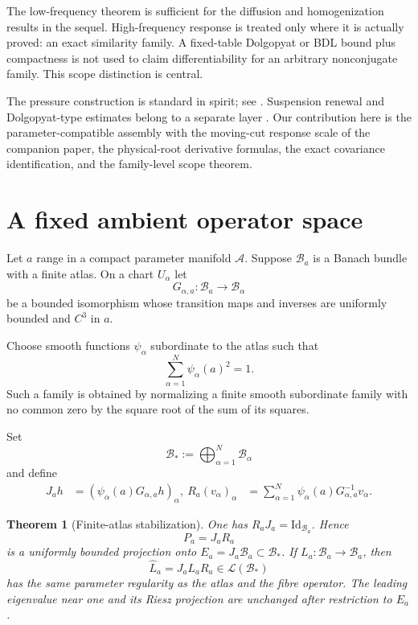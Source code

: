 \documentclass[11pt,reqno]{amsart}
\newtheorem{theorem}{Theorem}[section]
\theoremstyle{definition}
\theoremstyle{remark}
\newcommand{\A}{\mathcal A}
\newcommand{\B}{\mathcal B}
\newcommand{\Id}{\mathrm{Id}}
\begin{document}
The low-frequency theorem is sufficient for the diffusion and homogenization
results in the sequel.  High-frequency response is treated only where it is
actually proved: an exact similarity family.  A fixed-table Dolgopyat or BDL
bound plus compactness is not used to claim differentiability for an arbitrary
nonconjugate family.  This scope distinction is central.

The pressure construction is standard in spirit; see
\cite{Kato1995,KellerLiverani1999,ParryPollicott1990}.  Suspension renewal and
Dolgopyat-type estimates belong to a separate layer
\cite{Dolgopyat1998,ButterleyLiverani2007}.  Our contribution here is the
parameter-compatible assembly with the moving-cut response scale of the
companion paper, the physical-root derivative formulas, the exact covariance
identification, and the family-level scope theorem.

\section{A fixed ambient operator space}\label{sec:stabilization}

Let $a$ range in a compact parameter manifold $\A$.  Suppose $\B_a$ is a
Banach bundle with a finite atlas.  On a chart $U_\alpha$ let
\[
 G_{\alpha,a}:\B_a\longrightarrow\B_\alpha
\]
be a bounded isomorphism whose transition maps and inverses are uniformly
bounded and $C^3$ in $a$.

Choose smooth functions $\psi_\alpha$ subordinate to the atlas such that
\begin{equation}\label{eq:quadratic-partition}
 \sum_{\alpha=1}^N\psi_\alpha(a)^2=1.
\end{equation}
Such a family is obtained by normalizing a finite smooth subordinate family
with no common zero by the square root of the sum of its squares.

Set
\[
 \B_*:=\bigoplus_{\alpha=1}^N\B_\alpha
\]
and define
\begin{align}
 J_ah&=(\psi_\alpha(a)G_{\alpha,a}h)_\alpha,
 \label{eq:J}\
 R_a(v_\alpha)_\alpha&=
 \sum_{\alpha=1}^N\psi_\alpha(a)G_{\alpha,a}^{-1}v_\alpha.
 \label{eq:R}
\end{align}

\begin{theorem}[Finite-atlas stabilization]\label{thm:stabilization}
One has $R_aJ_a=\Id_{\B_a}$.  Hence
\[
 P_a=J_aR_a
\]
is a uniformly bounded projection onto $E_a=J_a\B_a\subset\B_*$.  If
$L_a:\B_a\to\B_a$, then
\[
 \widehat L_a=J_aL_aR_a\in\mathcal L(\B_*)
\]
has the same parameter regularity as the atlas and the fibre operator.  The
leading eigenvalue near one and its Riesz projection are unchanged after
restriction to $E_a$.
\end{theorem}
\end{document}
